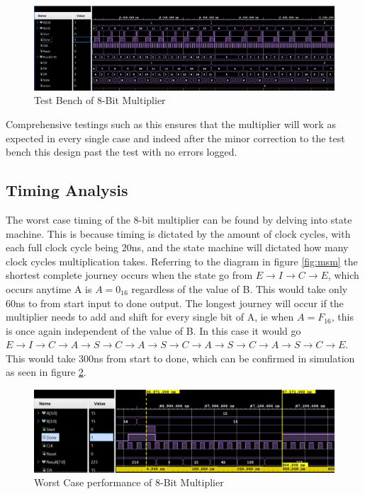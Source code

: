 \documentclass[11pt]{article}
\begin{document}
\begin{figure}[H]        
    \centering
    \includegraphics[width=\textwidth]{8bit_test.png}
    \caption{Test Bench of 8-Bit Multiplier}
    \label{fig:4bit_testbench}
\end{figure} 

Comprehensive testings such as this ensures that the multiplier will work as expected in every single case
and indeed after the minor correction to the test bench this design past the test with no errors logged.

\subsection{Timing Analysis}

The worst case timing of the 8-bit multiplier can be found by delving into state machine. 
This is because timing is dictated by the amount of clock cycles, with each full clock cycle being 20ns, and the state machine will dictated how many clock cycles multiplication takes.
Referring to the diagram in figure \ref{fig:msm} the shortest complete journey occurs when the state go from $E \rightarrow I \rightarrow C \rightarrow E$, which occurs anytime A is $A = 0_{16}$ regardless of the value of B.
This would take only 60ns to from start input to done output.
The longest journey will occur if the multiplier needs to add and shift for every single bit of A, ie when $A = F_{16}$, this is once again independent of the value of B.
In this case it would go $E \rightarrow I \rightarrow C \rightarrow A \rightarrow S \rightarrow C \rightarrow A \rightarrow S \rightarrow C \rightarrow A \rightarrow S \rightarrow C \rightarrow A \rightarrow S \rightarrow C \rightarrow E$.
This would take 300ns from start to done, which can be confirmed in simulation as seen in figure \ref{fig:4bit_worstcase}.

\begin{figure}[H]        
    \centering
    \includegraphics[width=\textwidth]{8bit_worst.png}
    \caption{Worst Case performance of 8-Bit Multiplier}
    \label{fig:4bit_worstcase}
\end{figure} 
\end{document}
